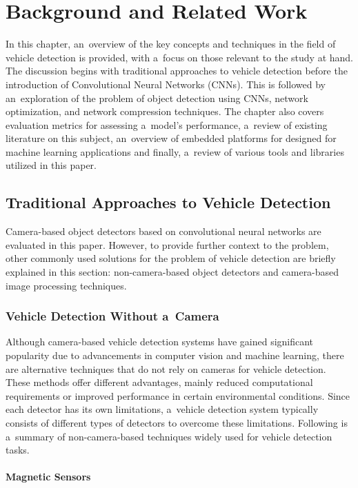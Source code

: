 \chapter{Background and Related Work}
\label{BackgroundAndRelatedWork}


In this chapter, an~overview of the key concepts and techniques in the field of
vehicle detection is provided, with a~focus on those relevant to the study at
hand. The discussion begins with traditional approaches to vehicle detection
before the introduction of Convolutional Neural Networks (CNNs). This is
followed by an~exploration of the problem of object detection using CNNs,
network optimization, and network compression techniques. The chapter also
covers evaluation metrics for assessing a~model's performance, a~review of
existing literature on this subject, an~overview of embedded platforms for
designed for machine learning applications and finally, a~review of various
tools and libraries utilized in this paper.

\section{Traditional Approaches to Vehicle Detection}

Camera-based object detectors based on convolutional neural networks are
evaluated in this paper. However, to provide further context to the problem,
other commonly used solutions for the problem of vehicle detection are briefly
explained in this section: non-camera-based object detectors and
camera-based image processing techniques.


\subsection{Vehicle Detection Without a~Camera}

Although camera-based vehicle detection systems have gained significant
popularity due to advancements in computer vision and machine learning, there
are alternative techniques that do not rely on cameras for vehicle detection.
These methods offer different advantages, mainly reduced computational
requirements or improved performance in certain environmental conditions. Since
each detector has its own limitations, a~vehicle detection system typically
consists of different types of detectors to overcome these limitations.
Following is a~summary of non-camera-based techniques widely used for vehicle
detection tasks.


\subsubsection*{Magnetic Sensors}

